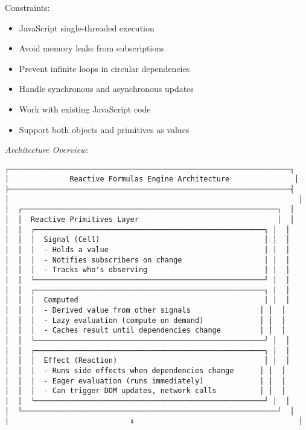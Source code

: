\documentclass[11pt]{article}
\begin{document}
Constraints:

\begin{itemize}
\item JavaScript single-threaded execution
\item Avoid memory leaks from subscriptions
\item Prevent infinite loops in circular dependencies
\item Handle synchronous and asynchronous updates
\item Work with existing JavaScript code
\item Support both objects and primitives as values
\end{itemize}

\emph{Architecture Overview}:

\begin{verbatim}
┌─────────────────────────────────────────────────────────────────┐
│              Reactive Formulas Engine Architecture               │
├─────────────────────────────────────────────────────────────────┤
│                                                                   │
│  ┌───────────────────────────────────────────────────────────┐  │
│  │  Reactive Primitives Layer                                │  │
│  │  ┌─────────────────────────────────────────────────────┐ │  │
│  │  │  Signal (Cell)                                      │ │  │
│  │  │  - Holds a value                                    │ │  │
│  │  │  - Notifies subscribers on change                   │ │  │
│  │  │  - Tracks who's observing                           │ │  │
│  │  └─────────────────────────────────────────────────────┘ │  │
│  │  ┌─────────────────────────────────────────────────────┐ │  │
│  │  │  Computed                                           │ │  │
│  │  │  - Derived value from other signals                │ │  │
│  │  │  - Lazy evaluation (compute on demand)             │ │  │
│  │  │  - Caches result until dependencies change         │ │  │
│  │  └─────────────────────────────────────────────────────┘ │  │
│  │  ┌─────────────────────────────────────────────────────┐ │  │
│  │  │  Effect (Reaction)                                  │ │  │
│  │  │  - Runs side effects when dependencies change      │ │  │
│  │  │  - Eager evaluation (runs immediately)             │ │  │
│  │  │  - Can trigger DOM updates, network calls          │ │  │
│  │  └─────────────────────────────────────────────────────┘ │  │
│  └───────────────────────────────────────────────────────────┘  │
│                            ↕                                      │

\end{verbatim}
\end{document}
